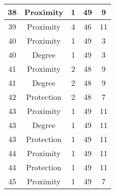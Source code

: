 \documentclass[results.tex]{subfiles}
\begin{document}
\begin{center}
\begin{tabular}{| c || c | c | c | c |}
            \hline
            38                      & Proximity                    & 1                      & 49                      & 9                    \\
            \hline
            39                      & Proximity                    & 4                      & 46                      & 11                   \\
            \hline
            40                      & Proximity                    & 1                      & 49                      & 3                    \\
            \hline
            40                      & Degree                       & 1                      & 49                      & 3                    \\
            \hline
            41                      & Proximity                    & 2                      & 48                      & 9                    \\
            \hline
            41                      & Degree                       & 2                      & 48                      & 9                    \\
            \hline
            42                      & Protection                   & 2                      & 48                      & 7                    \\
            \hline
            43                      & Proximity                    & 1                      & 49                      & 11                   \\
            \hline
            43                      & Degree                       & 1                      & 49                      & 11                   \\
            \hline
            43                      & Protection                   & 1                      & 49                      & 11                   \\
            \hline
            44                      & Proximity                    & 1                      & 49                      & 11                   \\
            \hline
            44                      & Protection                   & 1                      & 49                      & 11                   \\
            \hline
            45                      & Proximity                    & 1                      & 49                      & 7                    \\

\end{tabular}
\end{center}
\end{document}
